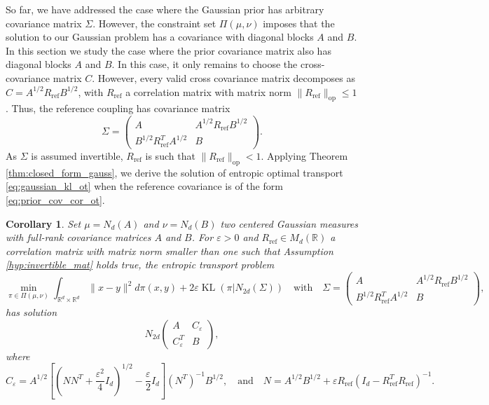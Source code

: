 \documentclass[]{article}
\DeclareMathOperator{\KL}{KL}
\DeclareMathOperator{\op}{op}
\DeclareMathOperator{\refe}{ref}
\numberwithin{equation}{section}
\theoremstyle{plain}
\newtheorem{cor}{Corollary}[section]
\begin{document}
So far, we have addressed the case where the Gaussian prior has arbitrary covariance matrix $\Sigma$. However, the constraint set $\Pi(\mu, \nu)$ imposes that the solution to our Gaussian problem has a covariance with diagonal blocks $A$ and $B$. In this section we study the case where the prior covariance matrix also has diagonal blocks $A$ and $B$. In this case, it only remains to choose the cross-covariance matrix $C$. However, every valid cross covariance matrix decomposes as $C=A^{1/2} R_{\refe} B^{1/2}$, with $R_{\refe}$ a correlation matrix with matrix norm $\| R_{\refe} \|_{\op} \leq 1$. Thus, the reference coupling has covariance matrix
\begin{equation}\label{eq:prior_cov_cor_ot}
	\Sigma = \begin{pmatrix}
		A &  A^{1/2} R_{\refe} B^{1/2}\\
		B^{1/2}R_{\refe}^TA^{1/2}& B
	\end{pmatrix}.
\end{equation}
As $\Sigma$ is assumed invertible, $R_{\refe}$ is such that $\|R_{\refe}\|_{\op} < 1$. Applying Theorem \ref{thm:closed_form_gauss}, we derive the solution of entropic optimal transport \eqref{eq:gaussian_kl_ot} when the reference covariance is of the form \eqref{eq:prior_cov_cor_ot}.
\begin{cor}\label{cor:solution_correlation_parameter}Set $\mu=N_d(A)$ and $\nu=N_d(B)$ two centered Gaussian measures with full-rank covariance matrices $A$ and $B$. For $\varepsilon > 0$ and $R_{\refe} \in M_d(\mathbb{R})$ a correlation matrix with matrix norm smaller than one such that Assumption \ref{hyp:invertible_mat} holds true, the entropic transport problem 
	\begin{equation}\label{eq:prior_cor_eot}
		\min_{\pi \in \Pi(\mu, \nu)} \int_{\mathbb{R}^d \times \mathbb{R}^d} \|x-y\|^2 d\pi(x,y) + 2\varepsilon \KL(\pi|N_{2d}(\Sigma)) \quad \text{with} \quad \Sigma=\begin{pmatrix}
			A &  A^{1/2} R_{\refe} B^{1/2}\\
			B^{1/2}R_{\refe}^TA^{1/2}& B
		\end{pmatrix},
	\end{equation}
	has solution
	\begin{equation*}
		N_{2d}\begin{pmatrix}
			A & C_\varepsilon\\
			C_\varepsilon^T& B
		\end{pmatrix}, 
	\end{equation*}
	where 
	\begin{equation}\label{eq:sol_correlation}
		C_\varepsilon =A^{1/2}\left[\left( NN^T+\frac{\varepsilon^2}{4}I_d\right)^{1/2} - \frac{\varepsilon}{2}I_d \right](N^T)^{-1}B^{1/2}, \quad \text{and} \quad N = A^{1/2}B^{1/2} + \varepsilon R_{\refe}(I_d - R_{\refe}^T R_{\refe})^{-1}.
	\end{equation}
\end{cor}
\end{document}
